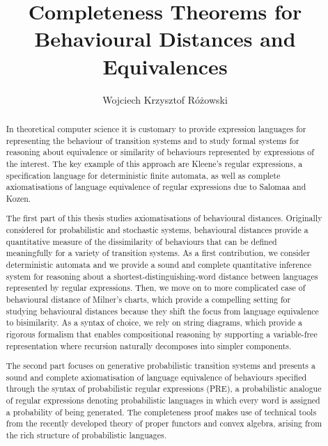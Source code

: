 
\title{Completeness Theorems for Behavioural Distances and Equivalences}
\author{Wojciech Krzysztof R\'{o}\.{z}owski}

\maketitle
\makedeclaration

\begin{abstract} %
 In theoretical computer science it is customary to provide expression languages for representing the behaviour of transition systems and to study formal systems for reasoning about equivalence or similarity of behaviours represented by expressions of the interest. The key example of this approach are Kleene's regular expressions, a specification language for deterministic finite automata, as well as complete axiomatisations of language equivalence of regular expressions due to Salomaa and Kozen.

The first part of this thesis studies axiomatisations of behavioural distances. Originally considered for probabilistic and stochastic systems, behavioural distances provide a quantitative measure of the dissimilarity of behaviours that can be defined meaningfully for a variety of transition systems. As a first contribution, we consider deterministic automata and we provide a sound and complete quantitative inference system for reasoning about a shortest-distinguishing-word distance between languages represented by regular expressions. Then, we move on to more complicated case of behavioural distance of Milner's charts, which provide a compelling setting for studying behavioural distances because they shift the focus from language equivalence to bisimilarity. As a syntax of choice, we rely on string diagrams, which provide a rigorous formalism that enables compositional reasoning by supporting a variable-free representation where recursion naturally decomposes into simpler components.

The second part focuses on generative probabilistic transition systems and presents a sound and complete axiomatisation of language equivalence of behaviours specified through the syntax of probabilistic regular expressions (PRE), a probabilistic analogue of regular expressions denoting probabilistic languages in which every word is assigned a probability of being generated. The completeness proof makes use of technical tools from the recently developed theory of proper functors and convex algebra, arising from the rich structure of probabilistic languages. 


\end{abstract}

